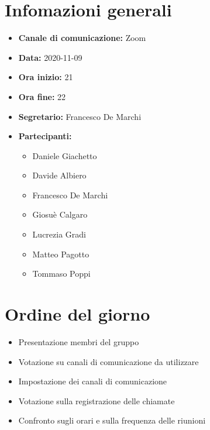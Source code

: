 \section{Infomazioni generali}

\begin{itemize}

	\item \textbf{Canale di comunicazione:} Zoom
	
	\item \textbf{Data:} 2020-11-09
	
	\item \textbf{Ora inizio:} 21
	
	\item \textbf{Ora fine:} 22
	
	\item \textbf{Segretario:} Francesco De Marchi
	
	\item \textbf{Partecipanti:}
	
		\begin{itemize}
		
			\item Daniele Giachetto
			\item Davide Albiero
			\item Francesco De Marchi
			\item Giosuè Calgaro
			\item Lucrezia Gradi
			\item Matteo Pagotto
			\item Tommaso Poppi
				 
		\end{itemize}

\end{itemize}

\section{Ordine del giorno}

\begin{itemize}

	\item Presentazione membri del gruppo

	\item Votazione su canali di comunicazione da utilizzare

	\item Impostazione dei canali di comunicazione

	\item Votazione sulla registrazione delle chiamate

	\item Confronto sugli orari e sulla frequenza delle riunioni


\end{itemize}

